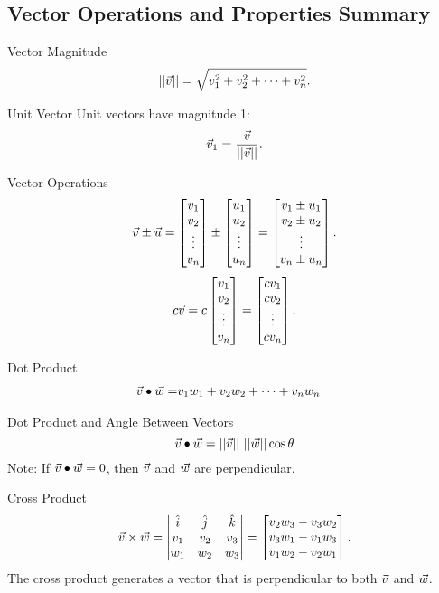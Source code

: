 \renewcommand\thesubsection{\thesection.\Alph{subsection}}
\setcounter{subsection}{18}
\subsection{Vector Operations and Properties Summary}
\begin{definition}{Vector Magnitude}
$$||\vec{v}||=\sqrt{v_1^2+v_2^2+\cdots+v_n^2}.$$
\end{definition}

\begin{definition}{Unit Vector}
Unit vectors have magnitude 1: $$\vec{v}_1=\frac{\vec{v}}{||\vec{v}||}. $$ 
\end{definition}

\begin{definition}{Vector Operations}
$$\vec{v}\pm \vec{u}=\begin{bmatrix}v_1\\v_2\\ \vdots\\v_n\end{bmatrix}\pm\begin{bmatrix}u_1\\u_2\\ \vdots\\u_n\end{bmatrix}=\begin{bmatrix}v_1\pm u_1\\v_2\pm u_2\\ \vdots\\v_n\pm u_n\end{bmatrix}. $$
$$c\vec{v}=c\begin{bmatrix}v_1\\v_2\\ \vdots\\v_n\end{bmatrix}=\begin{bmatrix}cv_1\\cv_2\\ \vdots \\ c v_n\end{bmatrix}.$$
\end{definition}

\begin{definition}{Dot Product}
\begin{align*}
\vec{v}\bullet\vec{w}=&v_1 w_1 + v_2 w_2 +\cdots+v_n w_n 
\end{align*}
\end{definition}

\begin{definition}{Dot Product and Angle Between Vectors}
$$\vcv\bullet\vcw=||\vcv|| \ ||\vcw||\cos\theta$$
Note: If $\vec{v}\bullet\vec{w}=0$, then $\vec{v}$ and $\vec{w}$ are perpendicular.
\end{definition}

\begin{definition}{Cross Product}
$$\vec{v}\times\vec{w}=\begin{vmatrix}\hat{i} & \hat{j} & \hat{k} \\ v_1 & v_2 & v_3 \\ w_1 & w_2 & w_3\end{vmatrix}=\begin{bmatrix} v_2w_3-v_3w_2 \\ v_3w_1-v_1w_3 \\ v_1w_2-v_2w_1 \end{bmatrix}. $$
The cross product generates a vector that is perpendicular to both $\vec{v}$ and $\vec{w}$.
\end{definition}

